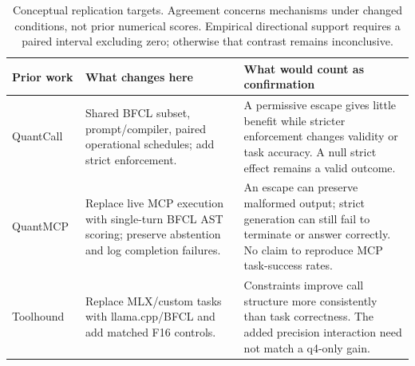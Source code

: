 \begin{table}[t]
\centering\footnotesize
\caption{Conceptual replication targets. Agreement concerns mechanisms under changed conditions, not prior numerical scores. Empirical directional support requires a paired interval excluding zero; otherwise that contrast remains inconclusive.}\label{tab:replication}
\begin{tabular}{p{}p{}p{}}
\toprule
Prior work & What changes here & What would count as confirmation \\\midrule
QuantCall~\cite{quantcall} & Shared BFCL subset, prompt/compiler, paired operational schedules; add strict enforcement. & A permissive escape gives little benefit while stricter enforcement changes validity or task accuracy. A null strict effect remains a valid outcome. \\
QuantMCP~\cite{quantmcp} & Replace live MCP execution with single-turn BFCL AST scoring; preserve abstention and log completion failures. & An escape can preserve malformed output; strict generation can still fail to terminate or answer correctly. No claim to reproduce MCP task-success rates. \\
Toolhound~\cite{toolhound} & Replace MLX/custom tasks with llama.cpp/BFCL and add matched F16 controls. & Constraints improve call structure more consistently than task correctness. The added precision interaction need not match a q4-only gain. \\\bottomrule
\end{tabular}
\end{table}
